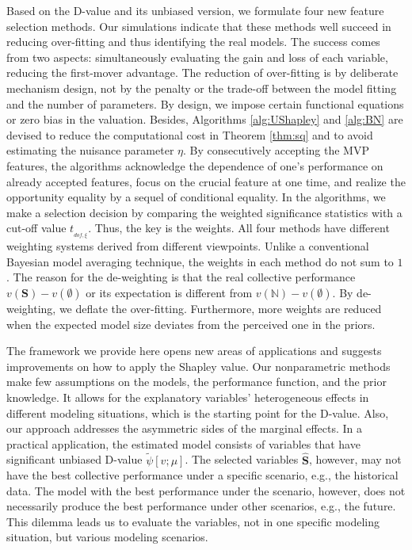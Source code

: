\documentclass[a4paper,12pt]{article}
\begin{document}
Based on the D-value and its unbiased version, we formulate four new feature selection methods.
Our simulations indicate that these methods well succeed in reducing over-fitting and thus identifying the real models.
The success comes from two aspects: simultaneously evaluating the gain and loss of each variable, reducing the first-mover advantage.
The reduction of over-fitting is by deliberate mechanism design, not by the penalty or the trade-off between the model fitting and the number of parameters.
By design, we impose certain functional equations or zero bias in the valuation.
Besides, Algorithms \ref{alg:UShapley} and \ref{alg:BN} are devised to reduce the computational cost in Theorem \ref{thm:sq} and to avoid estimating the nuisance parameter $\eta$.
By consecutively accepting the MVP features, the algorithms acknowledge the dependence of one's performance on already accepted features, focus on the crucial feature at one time, and
realize the opportunity equality by a sequel of conditional equality.
In the algorithms, we make a selection decision by comparing the weighted significance statistics with a cut-off value $t_{_{dof,\xi}}$. 
Thus, the key is the weights. All four methods have different weighting systems derived from different viewpoints.
Unlike a conventional Bayesian model averaging technique, the weights in each method do not sum to $1$. 
The reason for the de-weighting is that the real collective performance $v(\mathbf{S}) - v(\emptyset)$ or its expectation is different from $v(\mathbb{N}) - v(\emptyset)$. 
By de-weighting, we deflate the over-fitting. 
Furthermore, more weights are reduced when the expected model size deviates from the perceived one in the priors.

The framework we provide here opens new areas of applications and suggests improvements on how to apply the Shapley value.  
Our nonparametric methods make few assumptions on the models, the performance function, and the prior knowledge.
It allows for the explanatory variables' heterogeneous effects in different modeling situations, which is the starting point for the D-value. 
Also, our approach addresses the asymmetric sides of the marginal effects.
In a practical application, the estimated model consists of variables that have significant unbiased D-value $\tilde \psi[v;\mu]$.
The selected variables $\hat{\mathbf{S}}$, however, may not have the best collective performance under a specific scenario, e.g., the historical data.
The model with the best performance under the scenario, however, 
does not necessarily produce the best performance under other scenarios, e.g., the future. 
This dilemma leads us to evaluate the variables, not in one specific modeling situation, but various modeling scenarios.
\end{document}
